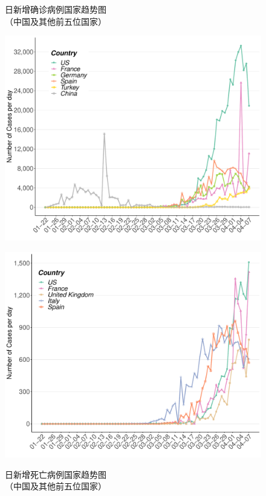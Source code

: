 \documentclass[
]{article}
\begin{document}
\begin{figure}[H]
\centering
\begin{minipage}[b]{0.45\linewidth}
\caption{日新增确诊病例国家趋势图\\（中国及其他前五位国家）}
\includegraphics[]{./input/covid2.pdf}
\label{}
\end{minipage}
\quad
\begin{minipage}[b]{0.45\linewidth}
\caption{日新增死亡病例国家趋势图\\（中国及其他前五位国家） }
\includegraphics[]{./input/covid3.pdf}
\label{}
\end{minipage}
\end{figure}
\end{document}
